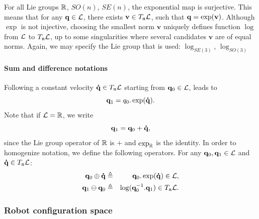 For all Lie groups $\mathbb{R}$, $SO(n)$, $SE(n)$, the exponential map is surjective. This means that for any $\mathbf{q}\in\mathcal{L}$, there exists $\mathbf{v}\in T_{\mathfrak{n}}\mathcal{L}$, such that $\mathbf{q} = \exp(\mathbf{v})$.
Although $\exp$ is not injective, choosing the smallest norm $\mathbf{v}$ uniquely defines function $\log$ from $\mathcal{L}$ to $T_{\mathfrak{n}}\mathcal{L}$, up to some singularities where several candidates $\mathbf{v}$ are of equal norms.
Again, we may specify the Lie group that is used: \href{https://github.com/stack-of-tasks/pinocchio/blob/f8f3b9a24eab527df79650e3dc73410f9a46a2b2/src/spatial/log.hxx\#L112}{$\log_{SE(3)}$}, \href{https://github.com/stack-of-tasks/pinocchio/blob/f8f3b9a24eab527df79650e3dc73410f9a46a2b2/src/spatial/log.hxx\#L15}{$\log_{SO(3)}$}

\paragraph{Sum and difference notations}

Following a constant velocity $\mathbf{\dot{q}}\in T_{\mathfrak{n}}\mathcal{L}$ starting from $\mathbf{q}_0\in\mathcal{L}$, leads to
$$
\mathbf{q}_1 = q_0.\exp(\mathbf{\dot{q}}).
$$
Note that if $\mathcal{L}=\mathbb{R}$, we write
$$
\mathbf{q}_1 = \mathbf{q}_0 + \mathbf{\dot{q}},
$$
since the Lie group operator of $\mathbb{R}$ is $+$ and $\exp_{\mathbb{R}}$ is the identity.
In order to homogenize notation, we define the following operators. For any
$\mathbf{q}_0,\mathbf{q}_1\in\mathcal{L}$ and $\mathbf{\dot{q}}\in T_{\mathfrak{n}}\mathcal{L}$:
\begin{eqnarray}\label{eq:plus}
  \conf_0 \oplus \dconf &\triangleq& \conf_0.\exp(\dconf) \in \liegroup,\\
  \label{eq:minus}
  \conf_1 \ominus \conf_0 &\triangleq& \log(\conf_0^{-1}.\conf_1) \in T_{\neutral}\liegroup.
\end{eqnarray}

\subsubsection{Robot configuration space}

